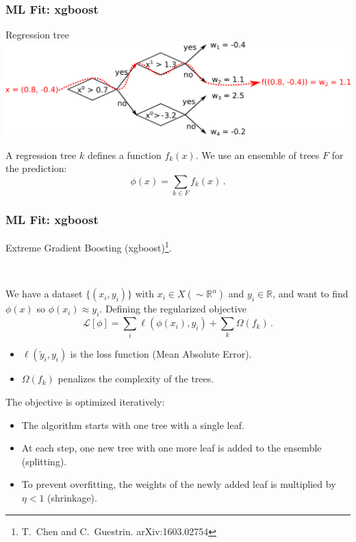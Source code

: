 \documentclass[mathserif, 10pt]{beamer}
\begin{document}
\begin{frame}\frametitle{ML Fit: xgboost}

    Regression tree
    \includegraphics[width=\textwidth]{figures/regtree.png}

    \vspace{1.5cm}

    A regression tree $k$ defines a function $f_k(x)$. We use an ensemble of trees $F$ for the prediction: $$\phi(x) = \sum_{k\in F} f_k(x)\,.$$
\end{frame}

\begin{frame}\frametitle{ML Fit: xgboost}

    Extreme Gradient Boosting (xgboost)\footnote[14]{T.~Chen and C.~Guestrin. arXiv:1603.02754}.

    ~

    We have a dataset $\{(x_i, y_i)\}$ with $x_i \in X (\sim\mathbb{R}^n)$ and $y_i \in \mathbb{R}$, and want to find $\phi(x)$ so $\phi(x_i)\approx y_i$. Defining the regularized objective
    $$\mathcal{L}[\phi] = \sum_i \ell(\phi(x_i), y_i) + \sum_k \Omega(f_k)\,. $$
    \begin{itemize}
        \item $\ell(\tilde{y}_i, y_i)$ is the loss function (Mean Absolute Error).
        \item $\Omega(f_k)$ penalizes the complexity of the trees.
    \end{itemize}
    The objective is optimized iteratively:
    \begin{itemize}
        \item The algorithm starts with one tree with a single leaf.
        \item At each step, one new tree with one more leaf is added to the ensemble (splitting).
        \item To prevent overfitting, the weights of the newly added leaf is multiplied by $\eta < 1$ (shrinkage).
    \end{itemize}
\end{frame}
\end{document}
